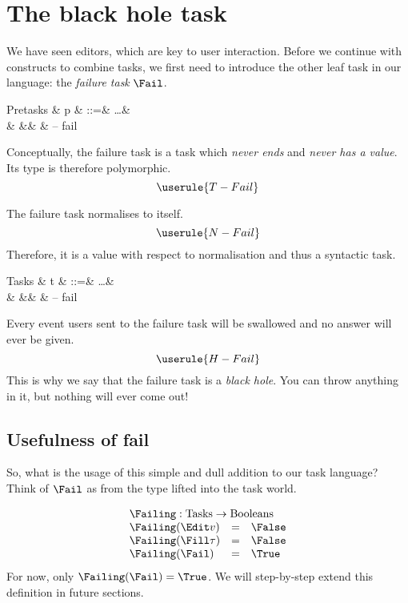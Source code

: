 
\section{The black hole task}

We have seen editors,
which are key to user interaction.
Before we continue with constructs to combine tasks,
we first need to introduce the other leaf task in our language:
the \emph{failure task} $\Fail$.

\begin{grammar}
  Pretasks
    & p & ::=& \ldots & \\
    &   &\mid& \Fail  & – fail \\
\end{grammar}
Conceptually,
the failure task is a task which \emph{never ends} and \emph{never has a value}.
Its type is therefore polymorphic.
\begin{equation*}
  \userule{T-Fail}
\end{equation*}

The failure task normalises to itself.
\begin{equation*}
  \userule{N-Fail}
\end{equation*}
Therefore,
it is a value with respect to normalisation and thus a syntactic task.
\begin{grammar}
  Tasks
    & t & ::=& \ldots & \\
    &   &\mid& \Fail  & – fail \\
\end{grammar}

Every event users sent to the failure task will be swallowed
and no answer will ever be given.
\begin{equation*}
  \userule{H-Fail}
\end{equation*}
This is why we say that the failure task is a \emph{black hole}.
You can throw anything in it,
but nothing will ever come out!


\subsection{Usefulness of fail}

So, what is the usage of this simple and dull addition to our task language?
Think of $\Fail$ as  from the  type lifted into the task world.

\begin{equation*}
  \begin{array}{lcl}
    \multicolumn{3}{l}{\Failing : \mathrm{Tasks} \to \mathrm{Booleans}} \\
    \Failing(\Edit v)    &=& \False \\
    \Failing(\Fill \tau) &=& \False \\
    \Failing(\Fail)      &=& \True
  \end{array}
\end{equation*}
For now,
only $\Failing(\Fail) = \True$.
We will step-by-step extend this definition in future sections.


